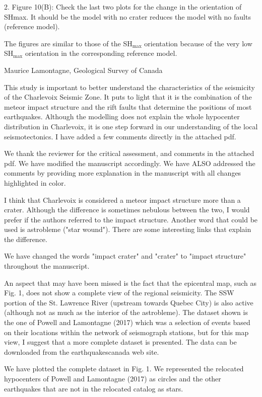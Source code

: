 \documentclass[12pt]{article}
\begin{document}
\begin{response}{2. Figure 10(B): Check the last two plots for the change in the orientation of SHmax. It should be the model with no crater reduces the model with no faults (reference model).}

  The figures are similar to those of the SH$_{\max}$ orientation because of the very low SH$_{\max}$ orientation in the corresponding reference model.
\end{response}




\begin{response}{Maurice Lamontagne, Geological Survey of Canada

This study is important to better understand the characteristics of the seismicity of the Charlevoix Seismic Zone. It puts to light that it is the combination of the meteor impact structure and the rift faults that determine the positions of most earthquakes. Although the modelling does not explain the whole hypocenter distribution in Charlevoix, it is one step forward in our understanding of the local seismotectonics. I have added a few comments directly in the attached pdf.}
    We thank the reviewer for the critical assessment, and comments in the attached pdf. We have modified the manuscript accordingly. We have ALSO addressed the comments by providing more explanation in the manuscript with all changes highlighted in color.
\end{response}


\begin{response}{I think that Charlevoix is considered a meteor impact structure more than a crater. Although the difference is sometimes nebulous between the two, I would prefer if the authors referred to the impact structure. Another word that could be used is astrobleme ("star wound"). There are some interesting links that explain the difference.}

  We have changed the words "impact crater" and "crater" to "impact structure" throughout the manuscript.
\end{response}

\begin{response}{An aspect that may have been missed is the fact that the epicentral map, such as Fig. 1, does not show a complete view of the regional seismicity. The SSW portion of the St. Lawrence River (upstream towards Quebec City) is also active (although not as much as the interior of the astrobleme). The dataset shown is the one of Powell and Lamontagne (2017) which was a selection of events based on their locations within the network of seismograph stations, but for this map view, I suggest that a more complete dataset is presented. The data can be downloaded from the earthquakescanada web site.}

  We have plotted the complete dataset in Fig. 1. We represented the relocated hypocenters of Powell and Lamontagne (2017) as circles and the other earthquakes that are not in the relocated catalog as stars.
\end{response}
\end{document}
